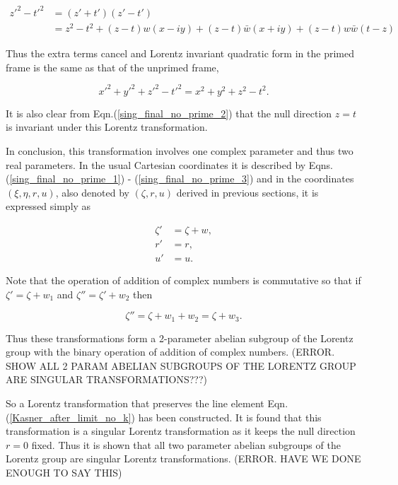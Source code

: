 \begin{align*}
{z'}^2 - {t'}^2 & = (z' + t')(z' - t') \\
& = z^2 - t^2 + (z - t)w(x-iy) + (z-t)\bar{w}(x+iy) + (z -t)w\bar{w}(t-z)
\end{align*}

\noindent Thus the extra terms cancel and Lorentz invariant quadratic form in the primed frame is the same as that of the unprimed frame,

\begin{equation*} 
{x'}^2 + {y'}^2 + {z'}^2 - {t'}^2 = {x}^2 + {y}^2 + {z}^2 - {t}^2.
\end{equation*} 

\noindent It is also clear from Eqn.(\ref{sing_final_no_prime_2}) that the null direction $z = t$ is invariant under this Lorentz transformation.

In conclusion, this transformation involves one complex parameter and thus two real parameters. In the usual Cartesian coordinates it is described by Eqns.(\ref{sing_final_no_prime_1}) - (\ref{sing_final_no_prime_3}) and in the coordinates $(\xi, \eta, r, u)$, also denoted by $(\zeta, r,u)$ derived in previous sections, it is expressed simply as

\begin{align*}
\zeta' & = \zeta + w, \\
r' & = r, \\
u' & = u.
\end{align*}

Note that the operation of addition of complex numbers is commutative so that if $\zeta' = \zeta + w_1$ and $\zeta'' = \zeta' + w_2$ then

\begin{equation*} 
\zeta'' = \zeta + w_1 + w_2 = \zeta + w_3.
\end{equation*} 
 
\noindent Thus these transformations form a 2-parameter abelian subgroup of the Lorentz group with the binary operation of addition of complex numbers. (ERROR. SHOW ALL 2 PARAM ABELIAN SUBGROUPS OF THE LORENTZ GROUP ARE SINGULAR TRANSFORMATIONS???)

So a Lorentz transformation that preserves the line element Eqn.(\ref{Kasner_after_limit_no_k}) has been constructed. It is found that this transformation is a singular Lorentz transformation as it keeps the null direction $r=0$ fixed. Thus it is shown that all two parameter abelian subgroups of the Lorentz group are singular Lorentz transformations. (ERROR. HAVE WE DONE ENOUGH TO SAY THIS)






